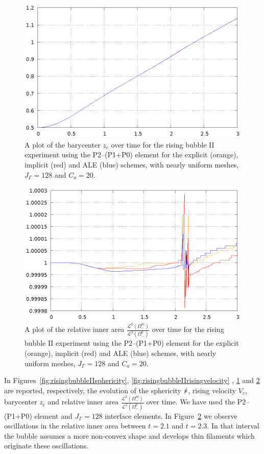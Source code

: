 \begin{figure}[htbp]
\centering
\includegraphics[width=.45\textwidth]
{figures/navier_stokes/rising_bubble_II_barycenter.ps}
\caption[Navier--Stokes rising bubble II barycenter]
{A plot of the barycenter $z_c$ over time for the rising bubble II experiment
using the P2--(P1+P0) element for the explicit (orange), implicit (red) and ALE
(blue) schemes, with nearly uniform meshes, $J_\Gamma=128$ and
$C_a=20$\textdegree.}
\label{fig:risingbubbleIIbarycenter}
\end{figure}

\begin{figure}[htbp]
\centering
\includegraphics[width=.45\textwidth]
{figures/navier_stokes/rising_bubble_II_inner_volume.ps}
\caption[Navier--Stokes rising bubble II inner area]
{A plot of the relative inner area
$\frac{\mathcal{L}^2(\Omega^m_-)}{\mathcal{L}^2(\Omega^0_-)}$ over time for the
rising bubble II experiment using the P2--(P1+P0) element for the explicit
(orange), implicit (red) and ALE (blue) schemes, with nearly uniform meshes,
$J_\Gamma=128$ and $C_a=20$\textdegree.}
\label{fig:risingbubbleIIinnervolume}
\end{figure}

In Figures~\ref{fig:risingbubbleIIsphericity},
\ref{fig:risingbubbleIIrisingvelocity} , \ref{fig:risingbubbleIIbarycenter} and
\ref{fig:risingbubbleIIinnervolume} are reported, respectively, the evolution of
the sphericity $\mbox{$s\!\!\!\!\:/$}$, rising velocity $V_c$, barycenter $z_c$ and relative
inner area $\frac{\mathcal{L}^2(\Omega^m_-)}{\mathcal{L}^2(\Omega^0_-)}$ over
time. We have used the P2--(P1+P0) element and $J_\Gamma=128$ interface
elements. In Figure~\ref{fig:risingbubbleIIinnervolume} we observe oscillations
in the relative inner area between $t=2.1$ and $t=2.3$. In that interval the
bubble assumes a more non-convex shape and develops thin filaments which
originate these oscillations.

